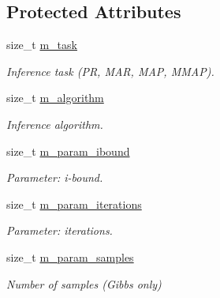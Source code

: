 \subsection*{Protected Attributes}
\begin{DoxyCompactItemize}
\item 
size\+\_\+t \hyperlink{classMerlin_a1f101237949cd820ad049a23c1871262}{m\+\_\+task}\hypertarget{classMerlin_a1f101237949cd820ad049a23c1871262}{}\label{classMerlin_a1f101237949cd820ad049a23c1871262}

\begin{DoxyCompactList}\small\item\em Inference task (PR, M\+AR, M\+AP, M\+M\+AP). \end{DoxyCompactList}\item 
size\+\_\+t \hyperlink{classMerlin_aca9d5d58864094ceeaee0878713de0c6}{m\+\_\+algorithm}\hypertarget{classMerlin_aca9d5d58864094ceeaee0878713de0c6}{}\label{classMerlin_aca9d5d58864094ceeaee0878713de0c6}

\begin{DoxyCompactList}\small\item\em Inference algorithm. \end{DoxyCompactList}\item 
size\+\_\+t \hyperlink{classMerlin_aefe5e3a4b1501b25614bf93023367e4f}{m\+\_\+param\+\_\+ibound}\hypertarget{classMerlin_aefe5e3a4b1501b25614bf93023367e4f}{}\label{classMerlin_aefe5e3a4b1501b25614bf93023367e4f}

\begin{DoxyCompactList}\small\item\em Parameter\+: i-\/bound. \end{DoxyCompactList}\item 
size\+\_\+t \hyperlink{classMerlin_a0a94b7f517db3842b43bf5683fa22c03}{m\+\_\+param\+\_\+iterations}\hypertarget{classMerlin_a0a94b7f517db3842b43bf5683fa22c03}{}\label{classMerlin_a0a94b7f517db3842b43bf5683fa22c03}

\begin{DoxyCompactList}\small\item\em Parameter\+: iterations. \end{DoxyCompactList}\item 
size\+\_\+t \hyperlink{classMerlin_a3a7b5f0168bf2ad8af6c69e47f239415}{m\+\_\+param\+\_\+samples}\hypertarget{classMerlin_a3a7b5f0168bf2ad8af6c69e47f239415}{}\label{classMerlin_a3a7b5f0168bf2ad8af6c69e47f239415}

\begin{DoxyCompactList}\small\item\em Number of samples (Gibbs only) \end{DoxyCompactList}\end{DoxyCompactItemize}


